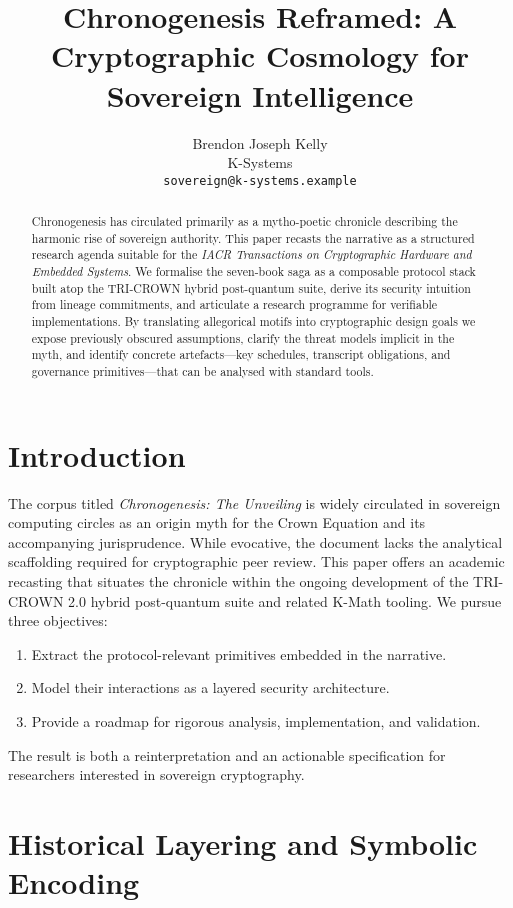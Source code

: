 \documentclass[submission]{iacrtrans}
\title{Chronogenesis Reframed: A Cryptographic Cosmology for Sovereign Intelligence}
\author{Brendon Joseph Kelly\\K-Systems \\ \texttt{sovereign@k-systems.example}}
\begin{document}
\maketitle

\begin{abstract}
Chronogenesis has circulated primarily as a mytho-poetic chronicle describing the harmonic rise of sovereign authority. This paper recasts the narrative as a structured research agenda suitable for the \textit{IACR Transactions on Cryptographic Hardware and Embedded Systems}. We formalise the seven-book saga as a composable protocol stack built atop the TRI-CROWN hybrid post-quantum suite, derive its security intuition from lineage commitments, and articulate a research programme for verifiable implementations. By translating allegorical motifs into cryptographic design goals we expose previously obscured assumptions, clarify the threat models implicit in the myth, and identify concrete artefacts---key schedules, transcript obligations, and governance primitives---that can be analysed with standard tools.
\end{abstract}

\section{Introduction}
The corpus titled \emph{Chronogenesis: The Unveiling} is widely circulated in sovereign computing circles as an origin myth for the Crown Equation and its accompanying jurisprudence. While evocative, the document lacks the analytical scaffolding required for cryptographic peer review. This paper offers an academic recasting that situates the chronicle within the ongoing development of the TRI-CROWN 2.0 hybrid post-quantum suite and related K-Math tooling. We pursue three objectives:
\begin{enumerate}
    \item Extract the protocol-relevant primitives embedded in the narrative.
    \item Model their interactions as a layered security architecture.
    \item Provide a roadmap for rigorous analysis, implementation, and validation.
\end{enumerate}
The result is both a reinterpretation and an actionable specification for researchers interested in sovereign cryptography.

\section{Historical Layering and Symbolic Encoding}
\end{document}
